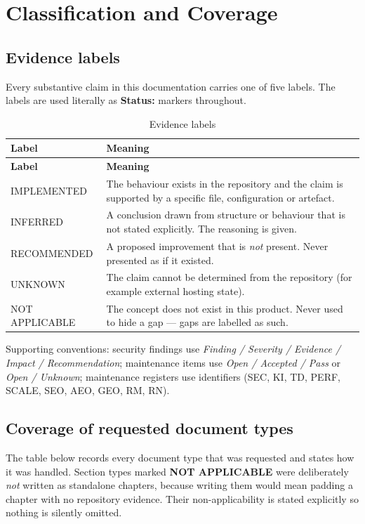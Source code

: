 \chapter{Classification and Coverage}
\label{app:classification}

\section{Evidence labels}

Every substantive claim in this documentation carries one of five labels. The
labels are used literally as \textbf{Status:} markers throughout.

\begin{longtable}{@{}L{3.4cm}L{11cm}@{}}
\caption{Evidence labels}\\
\toprule
\textbf{Label} & \textbf{Meaning} \\
\midrule
\endfirsthead
\toprule
\textbf{Label} & \textbf{Meaning} \\
\midrule
\endhead
IMPLEMENTED & The behaviour exists in the repository and the claim is supported by
a specific file, configuration or artefact. \\
INFERRED & A conclusion drawn from structure or behaviour that is not stated
explicitly. The reasoning is given. \\
RECOMMENDED & A proposed improvement that is \emph{not} present. Never presented
as if it existed. \\
UNKNOWN & The claim cannot be determined from the repository (for example
external hosting state). \\
NOT APPLICABLE & The concept does not exist in this product. Never used to hide a
gap --- gaps are labelled as such. \\
\bottomrule
\end{longtable}

Supporting conventions: security findings use \emph{Finding / Severity / Evidence
/ Impact / Recommendation}; maintenance items use \emph{Open / Accepted / Pass}
or \emph{Open / Unknown}; maintenance registers use identifiers (SEC, KI, TD,
PERF, SCALE, SEO, AEO, GEO, RM, RN).

\section{Coverage of requested document types}

The table below records every document type that was requested and states how it
was handled. Section types marked \textbf{NOT APPLICABLE} were deliberately
\emph{not} written as standalone chapters, because writing them would mean
padding a chapter with no repository evidence. Their non-applicability is stated
explicitly so nothing is silently omitted.

